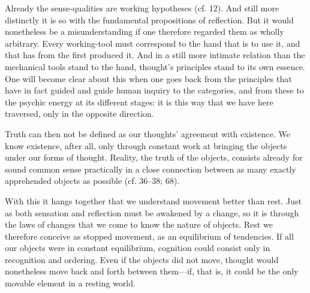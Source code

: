 \documentclass[12pt,a4paper]{book}
\newcommand{\opage}[1]{\marginnote{\footnotesize\textit{[#1]}}}
\begin{document}
Already the sense-qualities are working hypotheses (cf. 12). And still more
distinctly it is so with the fundamental propositions of reflection. But it
would nonetheless be a misunderstanding if one therefore regarded them as
wholly arbitrary. Every \opage{258}working-tool must correspond to the hand that is to
use it, and that has from the first produced it. And in a still more intimate
relation than the mechanical tools stand to the hand, thought's principles
stand to its own essence. One will become clear about this when one goes back
from the principles that have in fact guided and guide human inquiry to the
categories, and from these to the psychic energy at its different stages: it is
this way that we have here traversed, only in the opposite direction.

Truth can then not be defined as our thoughts' agreement with existence. We
know existence, after all, only through constant work at bringing the objects
under our forms of thought. Reality, the truth of the objects, consists
already for sound common sense practically in a close connection between as
many exactly apprehended objects as possible (cf. 36--38; 68).

With this it hangs together that we understand movement better than rest. Just
as both sensation and reflection must be awakened by a change, so it is through
the laws of changes that we come to know the nature of objects. Rest we
therefore conceive as stopped movement, as an equilibrium of tendencies. If
all our objects were in constant equilibrium, cognition could consist only in
recognition and ordering. Even if the objects did not move, thought would
nonetheless move back and forth between them---if, that is, it could be the
only movable element in a resting world.
\end{document}
